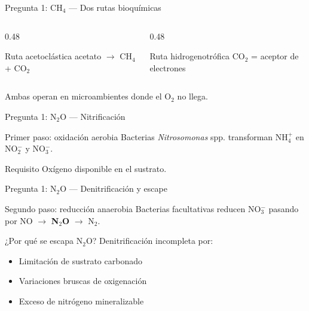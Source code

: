 \documentclass[aspectratio=169, 11pt]{beamer}
\begin{document}
\begin{frame}{Pregunta 1: CH$_4$ --- Dos rutas bioquímicas}
\begin{columns}[T]
\begin{column}{0.48\textwidth}
\begin{block}{Ruta acetoclástica}
\centering
\footnotesize
acetato $\rightarrow$ CH$_4$ + CO$_2$
\end{block}
\end{column}
\begin{column}{0.48\textwidth}
\begin{block}{Ruta hidrogenotrófica}
\centering
\footnotesize
CO$_2$ = aceptor de electrones
\end{block}
\end{column}
\end{columns}
\vspace{0.3cm}
\centering
\footnotesize Ambas operan en microambientes donde el O$_2$ no llega.
\end{frame}

\begin{frame}{Pregunta 1: N$_2$O --- Nitrificación}
\begin{block}{Primer paso: oxidación aerobia}
\footnotesize
Bacterias \textit{Nitrosomonas} spp. transforman NH$_4^+$ en NO$_2^-$ y NO$_3^-$.
\end{block}
\begin{exampleblock}{Requisito}
\footnotesize
Oxígeno disponible en el sustrato.
\end{exampleblock}
\end{frame}

\begin{frame}{Pregunta 1: N$_2$O --- Denitrificación y escape}
\begin{alertblock}{Segundo paso: reducción anaerobia}
\footnotesize
Bacterias facultativas reducen NO$_3^-$ pasando por NO $\rightarrow$ \textbf{N$_2$O} $\rightarrow$ N$_2$.
\end{alertblock}
\begin{alertblock}{¿Por qué se escapa N$_2$O?}
\footnotesize
Denitrificación incompleta por:
\begin{itemize}
    \item Limitación de sustrato carbonado
    \item Variaciones bruscas de oxigenación
    \item Exceso de nitrógeno mineralizable
\end{itemize}
\end{alertblock}
\end{frame}
\end{document}
